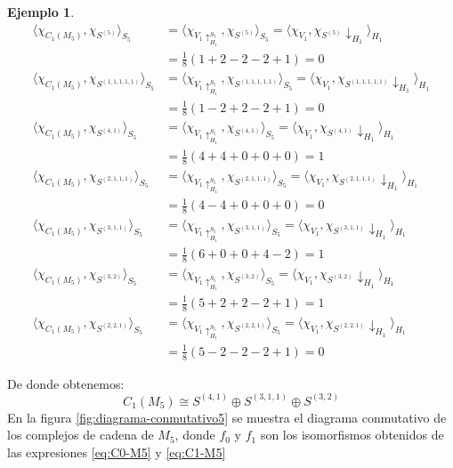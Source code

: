 \documentclass[12pt]{book}
\theoremstyle{definition}
\newtheorem{example}[theorem]{Ejemplo}
\newcounter{in}
\begin{document}
\begin{example}
{\scriptsize
  \begin{align*}
    \langle\chi_{C_{1}(M_{5})},\chi_{S^{(5)}}\rangle_{S_{5}}&=\langle\chi_{V_{1}\uparrow^{S_{5}}_{H_1}},\chi_{S^{(5)}}\rangle_{S_{5}}=\langle\chi_{V_{1}},\chi_{S^{(5)}}\downarrow_{H_{1}}\rangle_{H_{1}}\\
    &=\frac{1}{8}(1+2-2-2+1)=0\\
    \langle\chi_{C_{1}(M_{5})},\chi_{S^{(1,1,1,1,1)}}\rangle_{S_{5}}&=\langle\chi_{V_{1}\uparrow^{S_{5}}_{H_1}},\chi_{S^{(1,1,1,1,1)}}\rangle_{S_{5}}=\langle\chi_{V_{1}},\chi_{S^{(1,1,1,1,1)}}\downarrow_{H_{1}}\rangle_{H_{1}}\\
    &=\frac{1}{8}(1-2+2-2+1)=0 \\
    \langle\chi_{C_{1}(M_{5})},\chi_{S^{(4,1)}}\rangle_{S_{5}}&=\langle\chi_{V_{1}\uparrow^{S_{5}}_{H_1}},\chi_{S^{(4,1)}}\rangle_{S_{5}}=\langle\chi_{V_{1}},\chi_{S^{(4,1)}}\downarrow_{H_{1}}\rangle_{H_{1}}\\
    &=\frac{1}{8}(4+4+0+0+0)=1 \\
    \langle\chi_{C_{1}(M_{5})},\chi_{S^{(2,1,1,1)}}\rangle_{S_{5}}&=\langle\chi_{V_{1}\uparrow^{S_{5}}_{H_1}},\chi_{S^{(2,1,1,1)}}\rangle_{S_{5}}=\langle\chi_{V_{1}},\chi_{S^{(2,1,1,1)}}\downarrow_{H_{1}}\rangle_{H_{1}}\\
    &=\frac{1}{8}(4-4+0+0+0)=0 \\
    \langle\chi_{C_{1}(M_{5})},\chi_{S^{(3,1,1)}}\rangle_{S_{5}}&=\langle\chi_{V_{1}\uparrow^{S_{5}}_{H_1}},\chi_{S^{(3,1,1)}}\rangle_{S_{5}}=\langle\chi_{V_{1}},\chi_{S^{(3,1,1)}}\downarrow_{H_{1}}\rangle_{H_{1}}\\
    &=\frac{1}{8}(6+0+0+4-2)=1 \\
    \langle\chi_{C_{1}(M_{5})},\chi_{S^{(3,2)}}\rangle_{S_{5}}&=\langle\chi_{V_{1}\uparrow^{S_{5}}_{H_1}},\chi_{S^{(3,2)}}\rangle_{S_{5}}=\langle\chi_{V_{1}},\chi_{S^{(3,2)}}\downarrow_{H_{1}}\rangle_{H_{1}}\\
    &=\frac{1}{8}(5+2+2-2+1)=1 \\
    \langle\chi_{C_{1}(M_{5})},\chi_{S^{(2,2,1)}}\rangle_{S_{5}}&=\langle\chi_{V_{1}\uparrow^{S_{5}}_{H_1}},\chi_{S^{(2,2,1)}}\rangle_{S_{5}}=\langle\chi_{V_{1}},\chi_{S^{(2,2,1)}}\downarrow_{H_{1}}\rangle_{H_{1}}\\
    &=\frac{1}{8}(5-2-2-2+1)=0
  \end{align*}}

De donde obtenemos:
\begin{equation}
  \label{eq:C1-M5}
  C_{1}(M_{5})\cong S^{(4,1)}\oplus S^{(3,1,1)}\oplus S^{(3,2)}
\end{equation}
En la figura \ref{fig:diagrama-conmutativo5} se muestra el diagrama
conmutativo de los complejos de cadena de $M_{5}$, donde $f_{0}$ y
$f_{1}$ son los isomorfismos obtenidos de las expresiones
\ref{eq:C0-M5} y \ref{eq:C1-M5}


\end{example}
\end{document}
